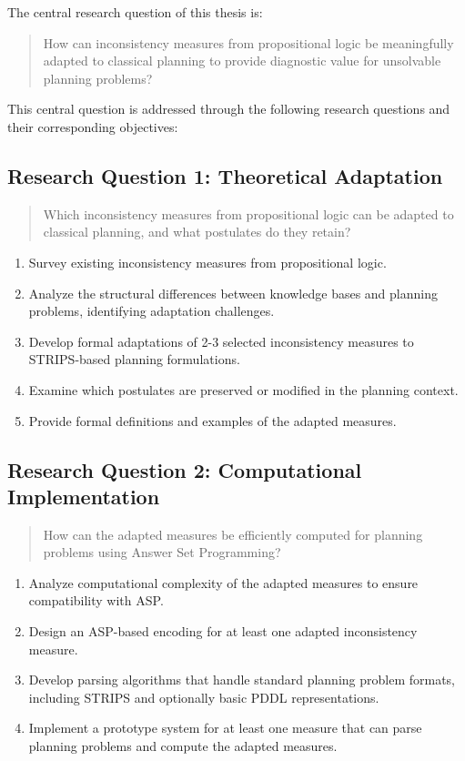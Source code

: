 \documentclass[proposal,english,palatino]{AIGpaper}
\begin{document}
The central research question of this thesis is:

\begin{quote}
  How can inconsistency measures from propositional logic be meaningfully adapted to classical planning to provide diagnostic value for unsolvable planning problems?
\end{quote}

This central question is addressed through the following research questions and their corresponding objectives:

\subsection{Research Question 1: Theoretical Adaptation}

\begin{quote}
  Which inconsistency measures from propositional logic can be adapted to classical planning, and what postulates do they retain?
\end{quote}

\begin{enumerate}
  \item[(1a)] Survey existing inconsistency measures from propositional logic.
  \item[(1b)] Analyze the structural differences between knowledge bases and planning problems, identifying adaptation challenges.
  \item[(1c)] Develop formal adaptations of 2-3 selected inconsistency measures to \ac{STRIPS}-based planning formulations.
  \item[(1d)] Examine which postulates are preserved or modified in the planning context.
  \item[(1e)] Provide formal definitions and examples of the adapted measures.
\end{enumerate}

\subsection{Research Question 2: Computational Implementation}

\begin{quote}
  How can the adapted measures be efficiently computed for planning problems using Answer Set Programming?
\end{quote}

\begin{enumerate}
  \item[(2a)] Analyze computational complexity of the adapted measures to ensure compatibility with \ac{ASP}.
  \item[(2b)] Design an \ac{ASP}-based encoding for at least one adapted inconsistency measure.
  \item[(2c)] Develop parsing algorithms that handle standard planning problem formats, including \ac{STRIPS} and optionally basic \ac{PDDL} representations.
  \item[(2d)] Implement a prototype system for at least one measure that can parse planning problems and compute the adapted measures.
\end{enumerate}
\end{document}
